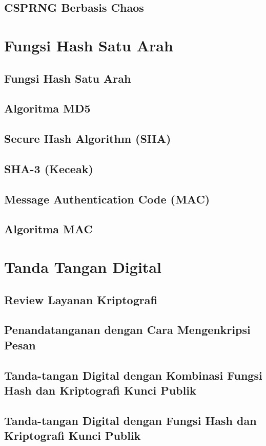 \documentclass{book}
\begin{document}
    \section{CSPRNG Berbasis Chaos}     
\chapter{Fungsi Hash Satu Arah}
     \section{Fungsi Hash Satu Arah}
     \section{Algoritma MD5}
     \section{Secure Hash Algorithm (SHA)}
     \section{SHA-3 (Keceak)}
     \section{Message Authentication Code (MAC)}
     \section{Algoritma MAC}
\chapter{Tanda Tangan Digital}
     \section{Review Layanan Kriptografi}
     \section{Penandatanganan dengan Cara Mengenkripsi Pesan}
     \section{Tanda-tangan Digital dengan Kombinasi Fungsi Hash dan Kriptografi Kunci Publik}
     \section{Tanda-tangan Digital dengan Fungsi Hash dan Kriptografi Kunci Publik}
\end{document}
